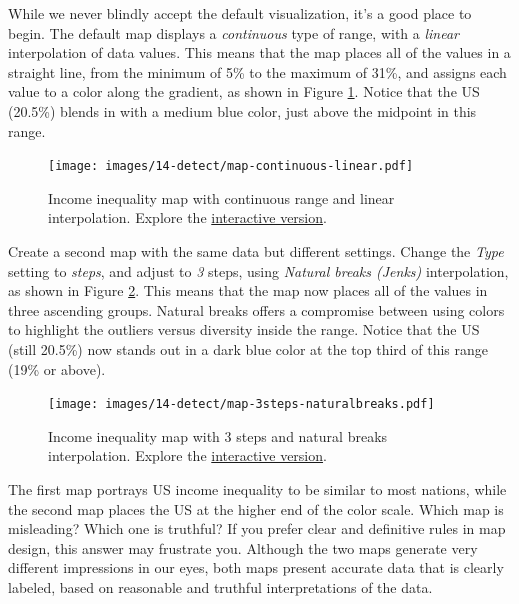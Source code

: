 \documentclass[
  english,
]{book}
\begin{document}
While we never blindly accept the default visualization, it's a good place to begin. The default map displays a \emph{continuous} type of range, with a \emph{linear} interpolation of data values. This means that the map places all of the values in a straight line, from the minimum of 5\% to the maximum of 31\%, and assigns each value to a color along the gradient, as shown in Figure \ref{fig:map-continuous-linear}. Notice that the US (20.5\%) blends in with a medium blue color, just above the midpoint in this range.



\begin{figure}
\centering
\texttt{[image: images/14-detect/map-continuous-linear.pdf]}
\caption{\label{fig:map-continuous-linear}Income inequality map with continuous range and linear interpolation. Explore the \href{https://datawrapper.dwcdn.net/aetEM/}{interactive version}.}
\end{figure}

Create a second map with the same data but different settings. Change the \emph{Type} setting to \emph{steps}, and adjust to \emph{3} steps, using \emph{Natural breaks (Jenks)} interpolation, as shown in Figure \ref{fig:map-3steps-naturalbreaks}. This means that the map now places all of the values in three ascending groups. Natural breaks offers a compromise between using colors to highlight the outliers versus diversity inside the range. Notice that the US (still 20.5\%) now stands out in a dark blue color at the top third of this range (19\% or above).



\begin{figure}
\centering
\texttt{[image: images/14-detect/map-3steps-naturalbreaks.pdf]}
\caption{\label{fig:map-3steps-naturalbreaks}Income inequality map with 3 steps and natural breaks interpolation. Explore the \href{https://datawrapper.dwcdn.net/VSfdZ/}{interactive version}.}
\end{figure}

The first map portrays US income inequality to be similar to most nations, while the second map places the US at the higher end of the color scale. Which map is misleading? Which one is truthful? If you prefer clear and definitive rules in map design, this answer may frustrate you. Although the two maps generate very different impressions in our eyes, both maps present accurate data that is clearly labeled, based on reasonable and truthful interpretations of the data.
\end{document}
